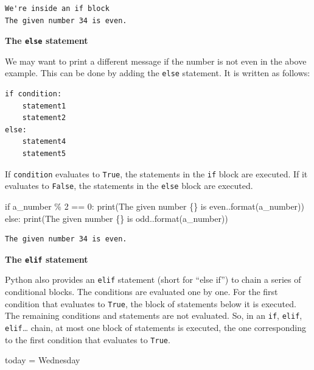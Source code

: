 \documentclass[
  letterpaper,
  DIV=11,
  numbers=noendperiod]{scrreprt}
\newenvironment{Shaded}{\begin{snugshade}}{\end{snugshade}}
\newcommand{\BuiltInTok}[1]{\textcolor[rgb]{0.00,0.23,0.31}{#1}}
\newcommand{\ControlFlowTok}[1]{\textcolor[rgb]{0.00,0.23,0.31}{#1}}
\newcommand{\DecValTok}[1]{\textcolor[rgb]{0.68,0.00,0.00}{#1}}
\newcommand{\NormalTok}[1]{\textcolor[rgb]{0.00,0.23,0.31}{#1}}
\newcommand{\OperatorTok}[1]{\textcolor[rgb]{0.37,0.37,0.37}{#1}}
\newcommand{\SpecialCharTok}[1]{\textcolor[rgb]{0.37,0.37,0.37}{#1}}
\newcommand{\StringTok}[1]{\textcolor[rgb]{0.13,0.47,0.30}{#1}}
\begin{document}
\begin{verbatim}
We're inside an if block
The given number 34 is even.
\end{verbatim}

\textbf{The \texttt{else} statement}

We may want to print a different message if the number is not even in
the above example. This can be done by adding the \texttt{else}
statement. It is written as follows:

\begin{verbatim}
if condition:
    statement1
    statement2
else:
    statement4
    statement5
\end{verbatim}

If \texttt{condition} evaluates to \texttt{True}, the statements in the
\texttt{if} block are executed. If it evaluates to \texttt{False}, the
statements in the \texttt{else} block are executed.

\begin{Shaded}
\begin{Highlighting}[]
\ControlFlowTok{if}\NormalTok{ a\_number }\OperatorTok{\%} \DecValTok{2} \OperatorTok{==} \DecValTok{0}\NormalTok{:}
    \BuiltInTok{print}\NormalTok{(}\StringTok{\textquotesingle{}The given number }\SpecialCharTok{\{\}}\StringTok{ is even.\textquotesingle{}}\NormalTok{.}\BuiltInTok{format}\NormalTok{(a\_number))}
\ControlFlowTok{else}\NormalTok{:}
    \BuiltInTok{print}\NormalTok{(}\StringTok{\textquotesingle{}The given number }\SpecialCharTok{\{\}}\StringTok{ is odd.\textquotesingle{}}\NormalTok{.}\BuiltInTok{format}\NormalTok{(a\_number))}
\end{Highlighting}
\end{Shaded}

\begin{verbatim}
The given number 34 is even.
\end{verbatim}

\textbf{The \texttt{elif} statement}

Python also provides an \texttt{elif} statement (short for ``else if'')
to chain a series of conditional blocks. The conditions are evaluated
one by one. For the first condition that evaluates to \texttt{True}, the
block of statements below it is executed. The remaining conditions and
statements are not evaluated. So, in an \texttt{if}, \texttt{elif},
\texttt{elif}\ldots{} chain, at most one block of statements is
executed, the one corresponding to the first condition that evaluates to
\texttt{True}.

\begin{Shaded}
\begin{Highlighting}[]
\NormalTok{today }\OperatorTok{=} \StringTok{\textquotesingle{}Wednesday\textquotesingle{}}
\end{Highlighting}
\end{Shaded}
\end{document}

